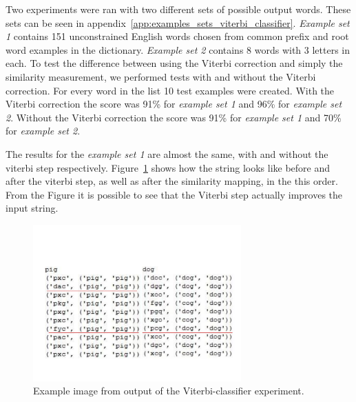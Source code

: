  Two experiments were ran with two different sets of possible output words.
 These sets can be seen in appendix~\ref{app:examples_sets_viterbi_classifier}.
 \emph{Example set 1} contains 151 unconstrained English words chosen from common prefix and root word examples in the dictionary.
 \emph{Example set 2} contains 8 words with 3 letters in each.
 To test the difference between using the Viterbi correction and simply the similarity measurement, we performed tests with and without the Viterbi correction.
 For every word in the list 10 test examples were created.
 With the Viterbi correction the score was 91\% for \emph{example set 1} and 96\% for \emph{example set 2}.
 Without the Viterbi correction the score was 91\% for \emph{example set 1} and 70\% for \emph{example set 2}.

 The results for the \emph{example set 1} are almost the same, with and without the viterbi step respectively.
 Figure~\ref{fig:viterbifig} shows how the string looks like before and after the viterbi step, as well as after the similarity mapping, in the this order.
 From the Figure it is possible to see that the Viterbi step actually improves the input string.

    \begin{figure}[htb] 
      \begin{center}
	\leavevmode
	\includegraphics[width=80mm]{viterbiimage.pdf}%
      \end{center}
      \caption{Example image from output of the Viterbi-classifier experiment.}
      \label{fig:viterbifig}
    \end{figure}






